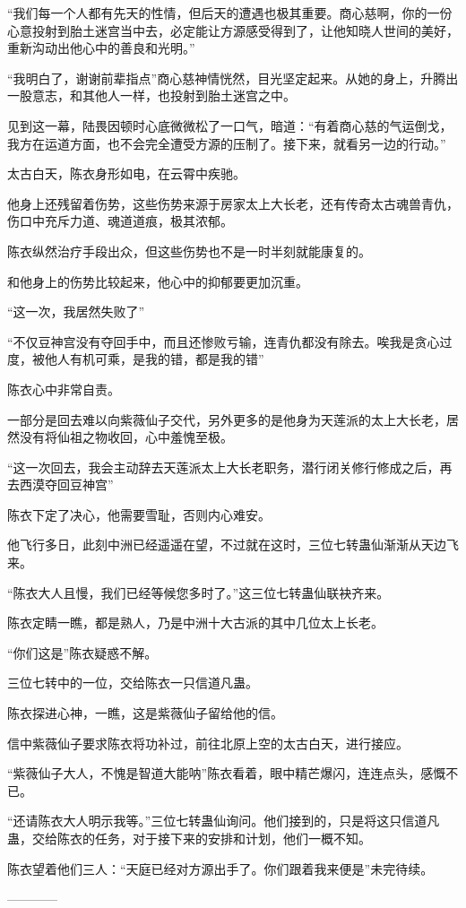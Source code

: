 \begin{this_body}
“我们每一个人都有先天的性情，但后天的遭遇也极其重要。商心慈啊，你的一份心意投射到胎土迷宫当中去，必定能让方源感受得到了，让他知晓人世间的美好，重新沟动出他心中的善良和光明。”

“我明白了，谢谢前辈指点”商心慈神情恍然，目光坚定起来。从她的身上，升腾出一股意志，和其他人一样，也投射到胎土迷宫之中。

见到这一幕，陆畏因顿时心底微微松了一口气，暗道：“有着商心慈的气运倒戈，我方在运道方面，也不会完全遭受方源的压制了。接下来，就看另一边的行动。”

太古白天，陈衣身形如电，在云霄中疾驰。

他身上还残留着伤势，这些伤势来源于房家太上大长老，还有传奇太古魂兽青仇，伤口中充斥力道、魂道道痕，极其浓郁。

陈衣纵然治疗手段出众，但这些伤势也不是一时半刻就能康复的。

和他身上的伤势比较起来，他心中的抑郁要更加沉重。

“这一次，我居然失败了”

“不仅豆神宫没有夺回手中，而且还惨败亏输，连青仇都没有除去。唉我是贪心过度，被他人有机可乘，是我的错，都是我的错”

陈衣心中非常自责。

一部分是回去难以向紫薇仙子交代，另外更多的是他身为天莲派的太上大长老，居然没有将仙祖之物收回，心中羞愧至极。

“这一次回去，我会主动辞去天莲派太上大长老职务，潜行闭关修行修成之后，再去西漠夺回豆神宫”

陈衣下定了决心，他需要雪耻，否则内心难安。

他飞行多日，此刻中洲已经遥遥在望，不过就在这时，三位七转蛊仙渐渐从天边飞来。

“陈衣大人且慢，我们已经等候您多时了。”这三位七转蛊仙联袂齐来。

陈衣定睛一瞧，都是熟人，乃是中洲十大古派的其中几位太上长老。

“你们这是”陈衣疑惑不解。

三位七转中的一位，交给陈衣一只信道凡蛊。

陈衣探进心神，一瞧，这是紫薇仙子留给他的信。

信中紫薇仙子要求陈衣将功补过，前往北原上空的太古白天，进行接应。

“紫薇仙子大人，不愧是智道大能呐”陈衣看着，眼中精芒爆闪，连连点头，感慨不已。

“还请陈衣大人明示我等。”三位七转蛊仙询问。他们接到的，只是将这只信道凡蛊，交给陈衣的任务，对于接下来的安排和计划，他们一概不知。

陈衣望着他们三人：“天庭已经对方源出手了。你们跟着我来便是”未完待续。

------------

\end{this_body}


